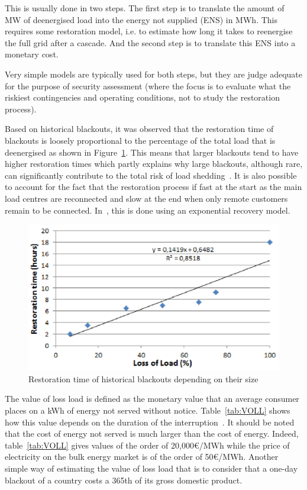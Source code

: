 This is usually done in two steps. The first step is to translate the amount of MW of deenergised load into the energy not supplied (ENS) in MWh. This requires some restoration model, i.e. to estimate how long it takes to reenergise the full grid after a cascade. And the second step is to translate this ENS into a monetary cost.

Very simple models are typically used for both steps, but they are judge adequate for the purpose of security assessment (where the focus is to evaluate what the riskiest contingencies and operating conditions, not to study the restoration process).

Based on historical blackouts, it was observed that the restoration time of blackouts is loosely proportional to the percentage of the total load that is deenergised as shown in Figure~\ref{fig:restoration_time}. This means that larger blackouts tend to have higher restoration times which partly explains why large blackouts, although rare, can significantly contribute to the total risk of load shedding~\cite{CascadingMethodoAndChallenges}. It is also possible to account for the fact that the restoration process if fast at the start as the main load centres are reconnected and slow at the end when only remote customers remain to be connected. In~\cite{PierreIEEEtran}, this is done using an exponential recovery model.

\begin{figure}
    \centering
    \includegraphics[width=0.6\linewidth]{Figs/RestorationTime.png}
    \caption{Restoration time of historical blackouts depending on their size~\cite{PierreIEEEtran}}
    \label{fig:restoration_time}
\end{figure}

The value of loss load is defined as the monetary value that an average consumer places on a kWh of energy not served without notice. Table~\ref{tab:VOLL} shows how this value depends on the duration of the interruption~\cite{VOLL}. It should be noted that the cost of energy not served is much larger than the cost of energy. Indeed, table~\ref{tab:VOLL} gives values of the order of 20,000€/MWh while the price of electricity on the bulk energy market is of the order of 50€/MWh. Another simple way of estimating the value of loss load that is to consider that a one-day blackout of a country costs a 365th of its gross domestic product.


